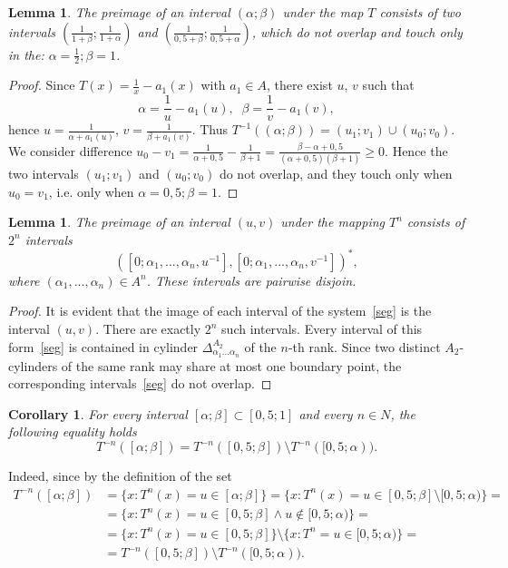 \documentclass[11pt]{amsart}
\theoremstyle{plain}
\newtheorem{lemma}[theorem]{Lemma}
\newtheorem{corollary}[theorem]{Corollary}
\theoremstyle{remark}
\begin{document}
\begin{lemma}
  The preimage of an interval $(\alpha;\beta)$ under the map $T$ consists of two intervals $(\frac{1}{1+\beta};\frac{1}{1+\alpha})$ and  $(\frac{1}{0,5+\beta};\frac{1}{0,5+\alpha})$, which do not overlap and touch only in the: $\alpha=\frac{1}{2}; \beta=1$.
\end{lemma}
\begin{proof}
  Since $T(x)=\frac{1}{x}-a_1(x)$ with $a_1\in A$, there exist $u$, $v$ such that
  \[\alpha=\frac{1}{u}-a_1(u),\;\; \beta=\frac{1}{v}-a_1(v),\]
  hence
  $u=\frac{1}{\alpha+a_1(u)}$,
      $v=\frac{1}{\beta+a_1(v)}.$
    Thus
    $T^{-1}((\alpha;\beta))=(u_1;v_1)\cup(u_{0};v_{0}).$
    We consider difference $u_{0}-v_1=\frac{1}{\alpha+0,5}-\frac{1}{\beta+1}=\frac{\beta-\alpha+0,5}{(\alpha+0,5)(\beta+1)}\geq0$.
    Hence the two intervals $(u_1;v_1)$ and $(u_{0};v_{0})$ do not overlap, and they touch only when  $u_{0}=v_1$, i.e. only when $\alpha=0,5; \beta=1$.
\end{proof}
\begin{lemma}
 The preimage of an interval $(u,v)$ under the mapping $T^n$ consists of $2^n$ intervals
  \begin{equation}\label{seg}
    ([0;\alpha_1,...,\alpha_n,u^{-1}],[0;\alpha_1,...,\alpha_n,v^{-1}])^*,
  \end{equation} where
  $(\alpha_1,...,\alpha_n)\in A^n$. These intervals are pairwise disjoin.
\end{lemma}
\begin{proof}
It is evident that the image of each interval of the system~\eqref{seg} is the interval $(u,v)$.
  There are exactly $2^n$ such intervals. 
  Every interval of this form~\eqref{seg} is contained in cylinder $\Delta^{A_2}_{\alpha_1...\alpha_n}$ of the $n$-th rank. Since two distinct $A_2$-cylinders of the same rank may share at most one boundary point, the corresponding intervals~\eqref{seg} do not overlap.
\end{proof}
\begin{corollary}
  For every interval $[\alpha;\beta]\subset[0,5;1]$ and every $n\in N$, the following equality holds
  \begin{equation}\label{op}
    T^{-n}([\alpha;\beta])=T^{-n}([0,5;\beta])\setminus T^{-n}([0,5;\alpha)).
      \end{equation}
      \end{corollary}
Indeed, since by the definition of the set
\begin{align*} T^{-n}([\alpha;\beta])&=\{x: T^n(x)=u\in [\alpha;\beta]\}=
\{x: T^n(x)=u\in [0,5;\beta]\setminus [0,5;\alpha)\}=\\
&=\{x: T^n(x)=u\in [0,5;\beta] \wedge u\notin [0,5;\alpha)\}=\\
&=\{x: T^n(x)=u\in [0,5;\beta]\}\setminus \{x: T^{n}=u\in [0,5;\alpha)\}=\\
&=T^{-n}([0,5;\beta])\setminus T^{-n}([0,5;\alpha)).
\end{align*}
\end{document}
